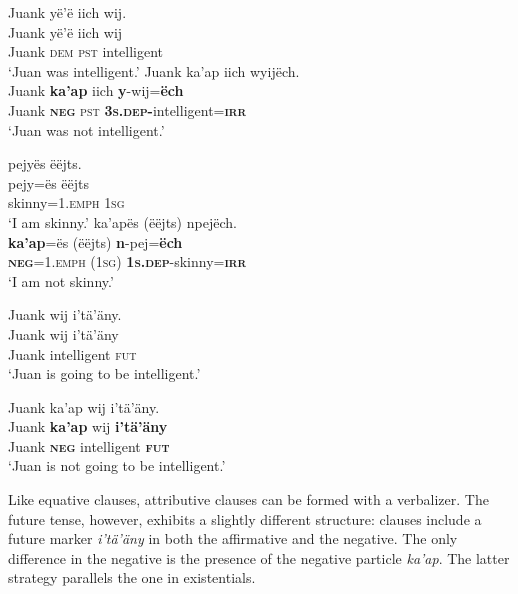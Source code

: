 \documentclass[output=paper,colorlinks,citecolor=brown,draft]{langscibook}
\begin{document}
\ea\label{ex:mix:49}
    \ea\label{ex:mix:49a}
        \glll Juank yë’ë iich wij.\\ 
              Juank yë’ë iich wij\\
              Juank \textsc{dem} \textsc{pst} intelligent\\
        \glt ‘Juan was intelligent.’     
    \ex\label{ex:mix:49b}
        \glll Juank ka’ap iich wyijëch.\\
              Juank \textbf{ka’ap} iich \textbf{y}{}-wij=\textbf{ëch}\\
              Juank \textbf{\textsc{neg}} \textsc{pst} \textbf{\textsc{3s.dep}}\textbf{{}-}intelligent=\textbf{\textsc{irr}}\\
        \glt ‘Juan was not intelligent.’
    \z
\z 

\ea\label{ex:mix:50}
    \ea\label{ex:mix:50a}
        \glll pejyës ëëjts.\\ 
              pejy=ës ëëjts\\
              skinny=1.\textsc{emph} \textsc{1sg} \\
        \glt ‘I am skinny.’    
    \ex\label{ex:mix:50b}
        \glll  ka’apës (ëëjts) npejëch.\\
             \textbf{ka’ap}=ës (ëëjts) \textbf{n}{}-pej=\textbf{ëch}\\
             \textbf{\textsc{neg}}\textsc{=1.emph} \textsc{(1sg)} \textbf{\textsc{1s.dep}}{}-skinny=\textbf{\textsc{irr}}\\
        \glt ‘I am not skinny.’
    \z
\z 

\ea\label{ex:mix:51}
    \ea\label{ex:mix:51a}
        \glll Juank wij i'tä’äny.\\ 
              Juank wij i'tä’äny\\
              Juank intelligent \textsc{fut}\\
        \glt ‘Juan is going to be intelligent.’ 
    
    \ex\label{ex:mix:51b}
        \glll Juank ka’ap wij i’tä’äny.\\
              Juank \textbf{ka’ap} wij \textbf{i'tä’äny}\\
              Juank \textbf{\textsc{neg}} intelligent \textbf{\textsc{fut}}\\
        \glt ‘Juan is not going to be intelligent.’
    \z
\z 
 
Like equative clauses, attributive clauses can be formed with a verbalizer. The future tense, however, exhibits a slightly different structure: clauses include a future marker \textit{i’tä’äny} in both the affirmative and the negative. The only difference in the negative is the presence of the negative particle \textit{ka’ap}. The latter strategy parallels the one in existentials.
\end{document}
